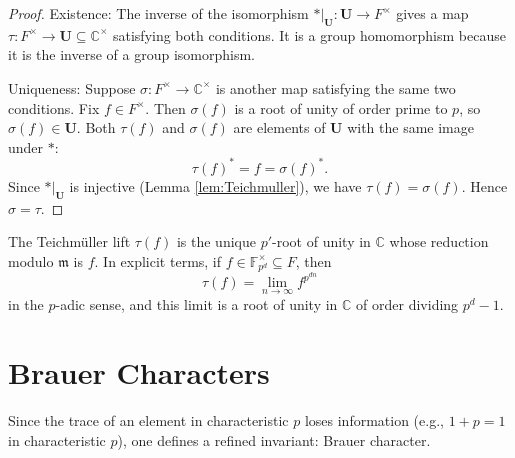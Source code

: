 \begin{proof}
Existence: The inverse of the isomorphism \(*|_{\mathbf{U}}: \mathbf{U} \to F^\times\) gives a map \(\tau: F^\times \to \mathbf{U} \subseteq \mathbb{C}^\times\) satisfying both conditions. It is a group homomorphism because it is the inverse of a group isomorphism.

Uniqueness: Suppose \(\sigma: F^\times \to \mathbb{C}^\times\) is another map satisfying the same two conditions. Fix \(f \in F^\times\). Then \(\sigma(f)\) is a root of unity of order prime to \(p\), so \(\sigma(f) \in \mathbf{U}\). Both \(\tau(f)\) and \(\sigma(f)\) are elements of \(\mathbf{U}\) with the same image under \(*\):
\[
\tau(f)^* = f = \sigma(f)^*.
\]
Since \(*|_{\mathbf{U}}\) is injective (Lemma \ref{lem:Teichmuller}), we have \(\tau(f) = \sigma(f)\). Hence \(\sigma = \tau\).
\end{proof}

\begin{remark}
The Teichm\"uller lift \(\tau(f)\) is the unique \(p'\)-root of unity in \(\mathbb{C}\) whose reduction modulo \(\mathfrak{m}\) is \(f\). In explicit terms, if \(f \in \mathbb{F}_{p^d}^\times \subseteq F\), then
\[
\tau(f) = \lim_{n \to \infty} f^{p^{dn}}
\]
in the \(p\)-adic sense, and this limit is a root of unity in \(\mathbb{C}\) of order dividing \(p^d - 1\).
\end{remark}



\section{Brauer Characters}


Since the trace of an element in characteristic \(p\) loses information (e.g., \(1 + p = 1\) in characteristic \(p\)), one defines a refined invariant: Brauer character.


